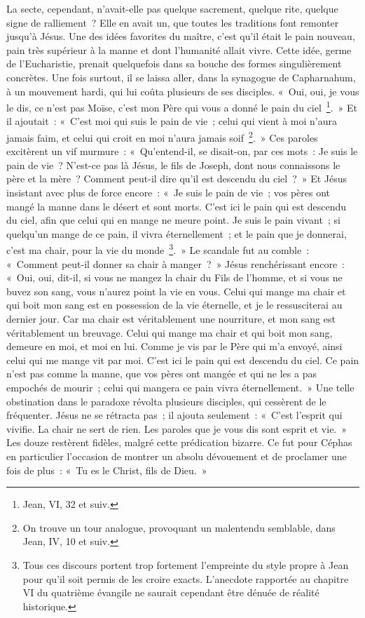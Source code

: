 \documentclass[french,twoside]{book} %
\begin{document}
La secte, cependant, n’avait-elle pas quelque sacrement, quelque rite, quelque signe de ralliement ? Elle en avait un, que toutes les traditions font remonter jusqu’à Jésus. Une des idées favorites du maître, c’est qu’il était le pain nouveau, pain très supérieur à la manne et dont l’humanité allait vivre. Cette idée, germe de l’Eucharistie, prenait quelquefois dans sa bouche des formes singulièrement concrètes. Une fois surtout, il se laissa aller, dans la synagogue de Capharnahum, à un mouvement hardi, qui lui coûta plusieurs de ses disciples. « Oui, oui, je vous le dis, ce n’est pas Moïse, c’est mon Père qui vous a donné le pain du ciel \footnote{Jean, VI, 32 et suiv.}. » Et il ajoutait : « C’est moi qui suis le pain de vie ; celui qui vient à moi n’aura jamais faim, et celui qui croit en moi n’aura jamais soif \footnote{On trouve un tour analogue, provoquant un malentendu semblable, dans Jean, IV, 10 et suiv.}. » Ces paroles excitèrent un vif murmure : « Qu’entend-il, se disait-on, par ces mots : Je suis le pain de vie ? N’est-ce pas là Jésus, le fils de Joseph, dont nous connaissons le père et la mère ? Comment peut-il dire qu’il est descendu du ciel ? » Et Jésus insistant avec plus de force encore : « Je suis le pain de vie ; vos pères ont mangé la manne dans le désert et sont morts. C’est ici le pain qui est descendu du ciel, afin que celui qui en mange ne meure point. Je suis le pain vivant ; si quelqu’un mange de ce pain, il vivra éternellement ; et le pain que je donnerai, c’est ma chair, pour la vie du monde \footnote{Tous ces discours portent trop fortement l’empreinte du style propre à Jean pour qu’il soit permis de les croire exacts. L’anecdote rapportée au chapitre VI du quatrième évangile ne saurait cependant être dénuée de réalité historique.}. » Le scandale fut au comble : « Comment peut-il donner sa chair à manger ? » Jésus renchérissant encore : « Oui, oui, dit-il, si vous ne mangez la chair du Fils de l’homme, et si vous ne buvez son sang, vous n’aurez point la vie en vous. Celui qui mange ma chair et qui boit mon sang est en possession de la vie éternelle, et je le ressusciterai au dernier jour. Car ma chair est véritablement une nourriture, et mon sang est véritablement un breuvage. Celui qui mange ma chair et qui boit mon sang, demeure en moi, et moi en lui. Comme je vis par le Père qui m’a envoyé, ainsi celui qui me mange vit par moi. C’est ici le pain qui est descendu du ciel. Ce pain n’est pas comme la manne, que vos pères ont mangée et qui ne les a pas empochés de mourir ; celui qui mangera ce pain vivra éternellement. » Une telle obstination dans le paradoxe révolta plusieurs disciples, qui cessèrent de le fréquenter. Jésus ne se rétracta pas ; il ajouta seulement : « C’est l’esprit qui vivifie. La chair ne sert de rien. Les paroles que je vous dis sont esprit et vie. » Les douze restèrent fidèles, malgré cette prédication bizarre. Ce fut pour Céphas en particulier l’occasion de montrer un absolu dévouement et de proclamer une fois de plus : « Tu es le Christ, fils de Dieu. »\par
\end{document}
